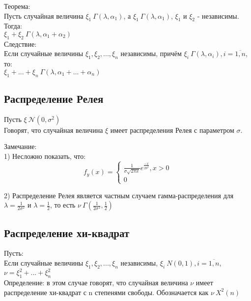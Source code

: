 Теорема:\\
Пусть случайная величина $\xi_{1} ~ \Gamma(\lambda, \alpha_{1})$, а $\xi_{1} ~ \Gamma(\lambda, \alpha_{1})$, $\xi_{1}$ и $\xi_{2}$ - независимы. Тогда:\\
$\xi_{1} + \xi_{2} ~ \Gamma(\lambda, \alpha_{1} + \alpha_{2})$\\

Следствие:\\
Если случайные величины $\xi_{1}, \xi_{2}, ..., \xi_{n}$ независимы, причём $\xi_{i} ~ \Gamma(\lambda, \alpha_{i}), i = \overline{1, n}$, то:\\
$\xi_{1} + ... + \xi_{n} ~ \Gamma(\lambda, \alpha_{1} + ... + \alpha_{n})$\\

\subsection{Распределение Релея}
Пусть $\xi ~ \mathcal{N}(0, \sigma^{2})$\\
Говорят, что случайная величина $\xi$ имеет распределения Релея с параметром $\sigma$.

Замечание:\\
1) Несложно показать, что:\\
\begin{equation}
f_{y}(x) = 
\begin{cases}
\frac{1}{\sigma\sqrt{2\pi x}}e^{\frac{-x}{2b^{2}}}, x > 0\\
0
\end{cases}
\end{equation}

2) Распределение Релея является частным случаем гамма-распределения для $\lambda = \frac{1}{2\sigma^{2}}$ и $\lambda = \frac{1}{2}$, то есть $\nu ~ \Gamma(\frac{1}{2\sigma^{2}}, \frac{1}{2})$\\

\subsection{Распределение хи-квадрат}
Пусть:\\
Если случайные величины $\xi_{1}, \xi_{2}, ..., \xi_{n}$ независимы, $\xi_{i} ~ N(0, 1), i = \overline{1, n}$, $\nu = \xi_{1}^{2} + ... + \xi_{n}^{2}$\\

Определение: в этом случае говорят, что случайная величина $\nu$ имеет распределение хи-квадрат с n степенями свободы. Обозначается как $\nu ~ X^{2}(n)$\\

